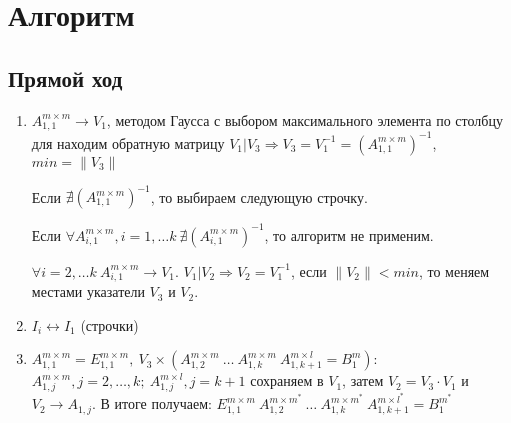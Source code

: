 \documentclass[12pt]{report}
\begin{document}
        \section{Алгоритм} \label{thread:alg}
        \subsection{Прямой ход}
        \begin{enumerate}
            \item \label{alg:reverse} $ A^{m \times m}_{1,1} \rightarrow V_{1} $, методом Гаусса с выбором
            максимального элемента по столбцу для находим обратную матрицу $V_{1} | V_{3} \Rightarrow V_{3} = V_{1}^{-1}
            =  (A^{m \times m}_{1,1})^{-1}$, $min = \| V_{3} \|  $ 
            
            Если $ \nexists (A^{m \times m}_{1,1})^{-1}$, то выбираем следующую строчку.
            
            Если $\forall A^{m \times m}_{i,1}, i = 1, \ldots k \ \nexists (A^{m \times m}_{i,1})^{-1}$,
            то алгоритм не применим.
            
            $\forall i = 2, \ldots k \ A^{m \times m}_{i,1} \rightarrow V_{1}$.
            $V_{1} | V_{2} \Rightarrow V_{2} = V_{1}^{-1}$, если $\| V_{2} \| < min$, 
            то меняем местами указатели $V_{3}$ и $V_{2}$.   
            
            \item \label{alg:swap} $I_{i} \leftrightarrow I_{1}$ (строчки)
            
            \item \label{alg:mult} 
            $A_{1,1}^{m \times m} = E_{1,1}^{m \times m}, \ V_{3} \times (A_{1,2}^{m \times m} \ \ldots \ A_{1,k}^{m \times m} \ A_{1,k+1}^{m \times l}
             = B^{m}_{1})$: \\
            $A_{1,j}^{m \times m}, j = 2, \ldots, k; \ A_{1,j}^{m \times l}, j = k + 1$ сохраняем в $V_{1}$,
            затем $V_{2} = V_{3} \cdot V_{1}$ и $V_{2} \rightarrow A_{1,j}$.
            В итоге получаем: $ E_{1,1}^{m \times m} \ A_{1,2}^{m \times m^*}    \ \ldots \ A_{1,k}^{m \times m^*} \ A_{1,k+1}^{m \times l^*} = B^{m^*}_{1}$
            

\end{enumerate}
\end{document}

